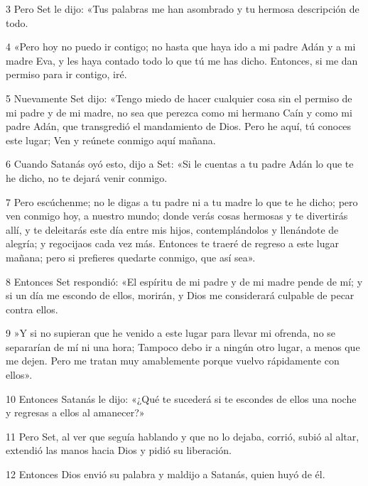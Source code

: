\par 3 Pero Set le dijo: «Tus palabras me han asombrado y tu hermosa descripción de todo.

\par 4 «Pero hoy no puedo ir contigo; no hasta que haya ido a mi padre Adán y a mi madre Eva, y les haya contado todo lo que tú me has dicho. Entonces, si me dan permiso para ir contigo, iré.

\par 5 Nuevamente Set dijo: «Tengo miedo de hacer cualquier cosa sin el permiso de mi padre y de mi madre, no sea que perezca como mi hermano Caín y como mi padre Adán, que transgredió el mandamiento de Dios. Pero he aquí, tú conoces este lugar; Ven y reúnete conmigo aquí mañana.

\par 6 Cuando Satanás oyó esto, dijo a Set: «Si le cuentas a tu padre Adán lo que te he dicho, no te dejará venir conmigo.

\par 7 Pero escúchenme; no le digas a tu padre ni a tu madre lo que te he dicho; pero ven conmigo hoy, a nuestro mundo; donde verás cosas hermosas y te divertirás allí, y te deleitarás este día entre mis hijos, contemplándolos y llenándote de alegría; y regocijaos cada vez más. Entonces te traeré de regreso a este lugar mañana; pero si prefieres quedarte conmigo, que así sea».

\par 8 Entonces Set respondió: «El espíritu de mi padre y de mi madre pende de mí; y si un día me escondo de ellos, morirán, y Dios me considerará culpable de pecar contra ellos.

\par 9 »Y si no supieran que he venido a este lugar para llevar mi ofrenda, no se separarían de mí ni una hora; Tampoco debo ir a ningún otro lugar, a menos que me dejen. Pero me tratan muy amablemente porque vuelvo rápidamente con ellos».

\par 10 Entonces Satanás le dijo: «¿Qué te sucederá si te escondes de ellos una noche y regresas a ellos al amanecer?»

\par 11 Pero Set, al ver que seguía hablando y que no lo dejaba, corrió, subió al altar, extendió las manos hacia Dios y pidió su liberación.

\par 12 Entonces Dios envió su palabra y maldijo a Satanás, quien huyó de él.

